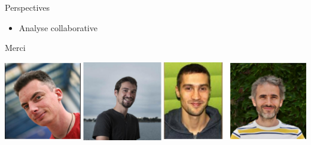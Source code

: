 \documentclass[ignorenonframetext,aspectratio=129]{beamer}
\providecommand{\tightlist}{%
  \setlength{\itemsep}{0pt}\setlength{\parskip}{0pt}}
\begin{document}
\begin{frame}{Perspectives}

\begin{itemize}
\tightlist
\item
  Analyse collaborative
\end{itemize}

\end{frame}

\begin{frame}{Merci}

\includegraphics{figures/team.png.png}

\end{frame}
\end{document}
